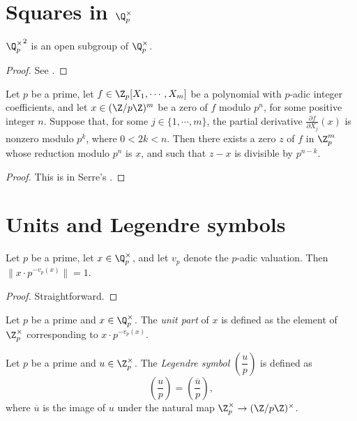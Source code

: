 \section[Squares in the p-adic units]{Squares in $\Q_p^{\times}$}\label{sec:padic_squares}

\begin{theorem}\label{thm:padic_squares_open}
\leanok
${\Q_p^\times}^2$ is an open subgroup of $\Q_p^\times$.
\end{theorem}

\begin{proof}
See \cite[\S II.3.3]{Ser73}.
\end{proof}

\begin{lemma}
  \label{lem:multivariable_hensel}
  \leanok
Let $p$ be a prime, let $f \in \Z_p[X_1, \cdots, X_m]$ be a polynomial with $p$-adic integer
coefficients, and let $x \in (\Z/p\Z)^m$ be a zero of $f$ modulo $p^n$, for some positive integer
$n$. Suppose that, for some $j \in \{1, \cdots, m\}$, the partial derivative
$\frac{\partial f}{\partial X_j}(x)$ is nonzero modulo $p^k$, where $0 < 2k < n$.
Then there exists a zero $z$ of $f$ in $\Z_p^m$ whose reduction modulo $p^n$ is $x$, and such that
$z-x$ is divisible by $p^{n-k}$.
\end{lemma}

\begin{proof}
This is in Serre's \cite[\S II.2 Theorem 1]{Ser73}.
\end{proof}

\section[Units and Legendre symbols]{Units and Legendre symbols}\label{sec:padic_legendre}

\begin{lemma}\label{lem:padic_unit_part_unit}
\leanok
Let $p$ be a prime, let $x \in \Q_p^\times$, and let $v_p$ denote the $p$-adic valuation. Then $\|x \cdot p^{-v_p(x)}\| = 1$.
\end{lemma}
\begin{proof}
Straightforward.
\end{proof}

\begin{definition}\label{def:padicUnitPart}
  \leanok
Let $p$ be a prime and $x \in \Q_p^\times$. The \emph{unit part} of $x$ is defined as the element
of $\Z_p^\times$ corresponding to $x \cdot p^{-v_p(x)}$.
\end{definition}

\begin{definition}\label{def:legendreSym}
  \leanok
Let $p$ be a prime and $u \in \Z_p^\times$. The \emph{Legendre symbol} $\left(\dfrac{u}{p}\right)$
is defined as
\[\left(\dfrac{u}{p}\right)=\left(\dfrac{\overline{u}}{p}\right),\]
where $\overline{u}$ is the image of $u$ under the natural map $\Z_p^\times \to (\Z/p\Z)^\times$.
\end{definition}
